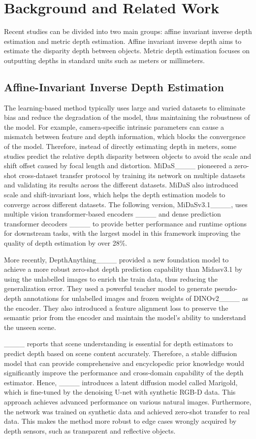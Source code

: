 \section{Background and Related Work}
Recent studies can be divided into two main groups: affine invariant inverse depth estimation and metric depth estimation. Affine invariant inverse depth aims to estimate the disparity depth between objects. Metric depth estimation focuses on outputting depths in standard units such as meters or millimeters.
\subsection{Affine-Invariant Inverse Depth Estimation}
The learning-based method typically uses large and varied datasets to eliminate bias and reduce the degradation of the model, thus maintaining the robustness of the model. For example, camera-specific intrinsic parameters can cause a mismatch between feature and depth information, which blocks the convergence of the model. Therefore, instead of directly estimating depth in meters, some studies predict the relative depth disparity between objects to avoid the scale and shift offset caused by focal length and distortion. MiDaS____ pioneered a zero-shot cross-dataset transfer protocol by training its network on multiple datasets and validating its results across the different datasets. MiDaS also introduced scale and shift-invariant loss, which helps the depth estimation models to converge across different datasets. The following version, MiDaSv3.1____, uses multiple vision transformer-based encoders ____ and dense prediction transformer decoders ____ to provide better performance and runtime options for downstream tasks, with the largest model in this framework improving the quality of depth estimation by over 28\%.

More recently, DepthAnything____ provided a new foundation model to achieve a more robust zero-shot depth prediction capability than Midasv3.1 by using the unlabelled images to enrich the train data, thus reducing the generalization error. They used a powerful teacher model to generate pseudo-depth annotations for unlabelled images and frozen weights of DINOv2____ as the encoder. They also introduced a feature alignment loss to preserve the semantic prior from the encoder and maintain the model's ability to understand the unseen scene.

____ reports that scene understanding is essential for depth estimators to predict depth based on scene content accurately. Therefore, a stable diffusion model that can provide comprehensive and encyclopedic prior knowledge would significantly improve the performance and cross-domain capability of the depth estimator. Hence, ____ introduces a latent diffusion model called Marigold, which is fine-tuned by the denoising U-net with synthetic RGB-D data. This approach achieves advanced performance on various natural images. Furthermore, the network was trained on synthetic data and achieved zero-shot transfer to real data. This makes the method more robust to edge cases wrongly acquired by depth sensors, such as transparent and reflective objects.

